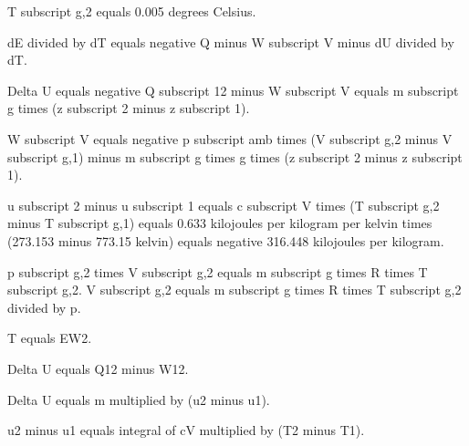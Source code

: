 T subscript g,2 equals 0.005 degrees Celsius.  

dE divided by dT equals negative Q minus W subscript V minus dU divided by dT.  

Delta U equals negative Q subscript 12 minus W subscript V equals m subscript g times (z subscript 2 minus z subscript 1).  

W subscript V equals negative p subscript amb times (V subscript g,2 minus V subscript g,1) minus m subscript g times g times (z subscript 2 minus z subscript 1).  

u subscript 2 minus u subscript 1 equals c subscript V times (T subscript g,2 minus T subscript g,1) equals 0.633 kilojoules per kilogram per kelvin times (273.153 minus 773.15 kelvin) equals negative 316.448 kilojoules per kilogram.  

p subscript g,2 times V subscript g,2 equals m subscript g times R times T subscript g,2.  
V subscript g,2 equals m subscript g times R times T subscript g,2 divided by p.

T equals EW2.  

Delta U equals Q12 minus W12.  

Delta U equals m multiplied by (u2 minus u1).  

u2 minus u1 equals integral of cV multiplied by (T2 minus T1).